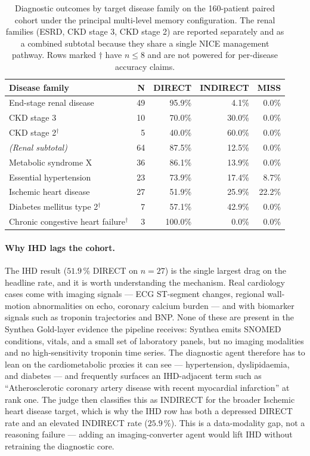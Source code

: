 \begin{table}[!htbp]
\centering
\caption{Diagnostic outcomes by target disease family on the
160-patient paired cohort under the principal multi-level memory
configuration. The renal families (ESRD, CKD stage 3, CKD stage 2)
are reported separately and as a combined subtotal because they share
a single NICE management pathway. Rows marked $\dagger$ have
$n \le 8$ and are not powered for per-disease accuracy claims.}
\label{tab:e2e_family}
\small
\begin{tabular}{@{}lrrrr@{}}
\toprule
\textbf{Disease family}            & \textbf{N} & \textbf{DIRECT} & \textbf{INDIRECT} & \textbf{MISS} \\
\midrule
End-stage renal disease            & 49 & 95.9\%   &  4.1\%   &  0.0\% \\
CKD stage 3                        & 10 & 70.0\%   & 30.0\%   &  0.0\% \\
CKD stage 2$^\dagger$              &  5 & 40.0\%   & 60.0\%   &  0.0\% \\
\textit{(Renal subtotal)}          & 64 & 87.5\%   & 12.5\%   &  0.0\% \\
\midrule
Metabolic syndrome X               & 36 & 86.1\%   & 13.9\%   &  0.0\% \\
Essential hypertension             & 23 & 73.9\%   & 17.4\%   &  8.7\% \\
Ischemic heart disease             & 27 & 51.9\%   & 25.9\%   & 22.2\% \\
Diabetes mellitus type 2$^\dagger$ &  7 & 57.1\%   & 42.9\%   &  0.0\% \\
Chronic congestive heart failure$^\dagger$ &  3 & 100.0\% & 0.0\%  &  0.0\% \\
\bottomrule
\end{tabular}
\end{table}

\paragraph{Why IHD lags the cohort.}
The IHD result ($51.9\,\%$ DIRECT on $n=27$) is the single largest
drag on the headline rate, and it is worth understanding the
mechanism. Real cardiology cases come with imaging signals --- ECG
ST-segment changes, regional wall-motion abnormalities on echo,
coronary calcium burden --- and with biomarker signals such as
troponin trajectories and BNP. None of these are present in the
Synthea Gold-layer evidence the pipeline receives: Synthea
emits SNOMED conditions, vitals, and a small set of laboratory
panels, but no imaging modalities and no high-sensitivity troponin
time series. The diagnostic agent therefore has to lean on the
cardiometabolic proxies it can see --- hypertension, dyslipidaemia,
and diabetes --- and frequently surfaces an IHD-adjacent term such as
``Atherosclerotic coronary artery disease with recent myocardial
infarction'' at rank one. The judge then classifies this as INDIRECT
for the broader Ischemic heart disease target, which is why the IHD
row has both a depressed DIRECT rate and an elevated INDIRECT rate
($25.9\,\%$). This is a data-modality gap, not a reasoning failure
--- adding an imaging-converter agent would lift IHD without
retraining the diagnostic core.

